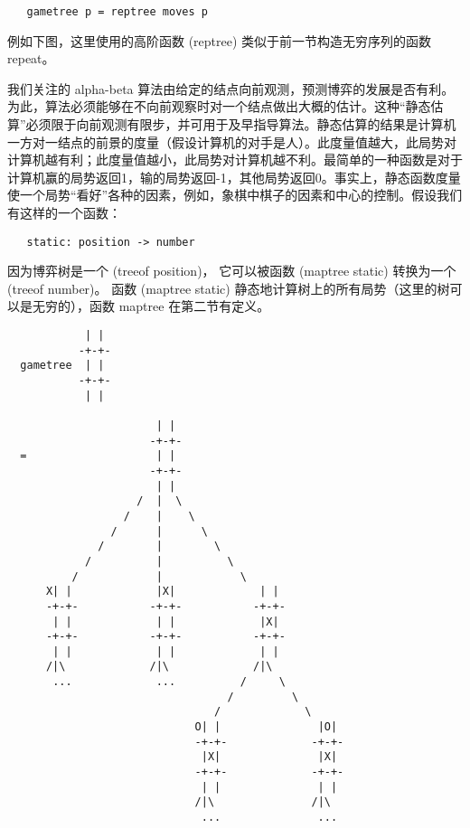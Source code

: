 \documentclass[12pt]{article}
\begin{document}
\begin{verbatim}
   gametree p = reptree moves p
\end{verbatim}

例如下图，这里使用的高阶函数 (reptree) 类似于前一节构造无穷序列的函数 repeat。

我们关注的 alpha-beta 算法由给定的结点向前观测，预测博弈的发展是否有利。为此，算法必须能够在不向前观察时对一个结点做出大概的估计。这种``静态估算''必须限于向前观测有限步，并可用于及早指导算法。静态估算的结果是计算机一方对一结点的前景的度量（假设计算机的对手是人）。此度量值越大，此局势对计算机越有利；此度量值越小，此局势对计算机越不利。最简单的一种函数是对于计算机赢的局势返回1，输的局势返回-1，其他局势返回0。事实上，静态函数度量使一个局势``看好''各种的因素，例如，象棋中棋子的因素和中心的控制。假设我们有这样的一个函数：

\begin{verbatim}
   static: position -> number
\end{verbatim}

因为博弈树是一个 (treeof position)， 它可以被函数 (maptree static) 转换为一个 (treeof number)。 函数 (maptree static) 静态地计算树上的所有局势（这里的树可以是无穷的），函数 maptree 在第二节有定义。

\begin{verbatim}
            | |
           -+-+-
  gametree  | |
           -+-+-
            | |

                       | |
                      -+-+-
  =                    | |
                      -+-+-
                       | |
                    /  |  \
                  /    |    \
                /      |      \
              /        |        \
            /          |          \
          /            |            \
      X| |             |X|             | |
      -+-+-           -+-+-           -+-+-
       | |             | |             |X|
      -+-+-           -+-+-           -+-+-
       | |             | |             | |
      /|\             /|\             /|\
       ...             ...          /     \
                                  /         \
                                /             \
                             O| |               |O|
                             -+-+-             -+-+-
                              |X|               |X|
                             -+-+-             -+-+-
                              | |               | |
                             /|\               /|\
                              ...               ...

\end{verbatim}
 
\end{document}
